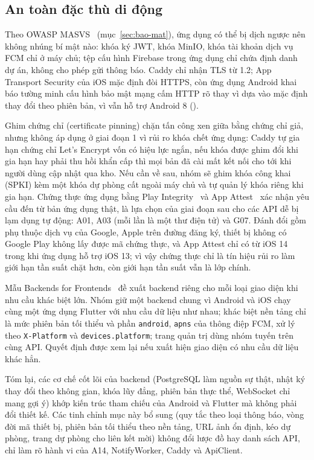 \subsection{An toàn đặc thù di động}\label{ssec:an-toan-di-dong}

Theo OWASP MASVS~\cite{masvs} (mục~\ref{sec:bao-mat}), ứng dụng có thể bị dịch ngược nên không nhúng bí mật nào: khóa ký JWT, khóa MinIO, khóa tài khoản dịch vụ FCM chỉ ở máy chủ; tệp cấu hình Firebase trong ứng dụng chỉ chứa định danh dự án, không cho phép gửi thông báo. Caddy chỉ nhận TLS từ 1.2; App Transport Security của iOS mặc định đòi HTTPS, còn ứng dụng Android khai báo tường minh cấu hình bảo mật mạng cấm HTTP rõ thay vì dựa vào mặc định thay đổi theo phiên bản, vì vẫn hỗ trợ Android 8 ().

Ghim chứng chỉ (certificate pinning) chặn tấn công xen giữa bằng chứng chỉ giả, nhưng không áp dụng ở giai đoạn 1 vì rủi ro khóa chết ứng dụng: Caddy tự gia hạn chứng chỉ Let's Encrypt vốn có hiệu lực ngắn, nếu khóa được ghim đổi khi gia hạn hay phải thu hồi khẩn cấp thì mọi bản đã cài mất kết nối cho tới khi người dùng cập nhật qua kho. Nếu cần về sau, nhóm sẽ ghim khóa công khai (SPKI) kèm một khóa dự phòng cất ngoài máy chủ và tự quản lý khóa riêng khi gia hạn. Chứng thực ứng dụng bằng Play Integrity~\cite{playintegrity} và App Attest~\cite{appattest} xác nhận yêu cầu đến từ bản ứng dụng thật, là lựa chọn của giai đoạn sau cho các API dễ bị lạm dụng tự động: A01, A03 (mỗi lần là một thư điện tử) và G07. Đánh đổi gồm phụ thuộc dịch vụ của Google, Apple trên đường đăng ký, thiết bị không có Google Play không lấy được mã chứng thực, và App Attest chỉ có từ iOS 14 trong khi ứng dụng hỗ trợ iOS 13; vì vậy chứng thực chỉ là tín hiệu rủi ro làm giới hạn tần suất chặt hơn, còn giới hạn tần suất vẫn là lớp chính.

Mẫu Backends for Frontends~\cite{bff} đề xuất backend riêng cho mỗi loại giao diện khi nhu cầu khác biệt lớn. Nhóm giữ một backend chung vì Android và iOS chạy cùng một ứng dụng Flutter với nhu cầu dữ liệu như nhau; khác biệt nền tảng chỉ là mức phiên bản tối thiểu và phần \texttt{android}, \texttt{apns} của thông điệp FCM, xử lý theo \texttt{X-Platform} và \texttt{devices.platform}; trang quản trị dùng nhóm tuyến  trên cùng API. Quyết định được xem lại nếu xuất hiện giao diện có nhu cầu dữ liệu khác hẳn.

Tóm lại, các cơ chế cốt lõi của backend (PostgreSQL làm nguồn sự thật, nhật ký thay đổi theo không gian, khóa lũy đẳng, phiên bản thực thể, WebSocket chỉ mang gợi ý) khớp kiến trúc tham chiếu của Android và Flutter mà không phải đổi thiết kế. Các tinh chỉnh mục này bổ sung (quy tắc theo loại thông báo, vòng đời mã thiết bị, phiên bản tối thiểu theo nền tảng, URL ảnh ổn định, kéo dự phòng, trang dự phòng cho liên kết mời) không đổi lược đồ hay danh sách API, chỉ làm rõ hành vi của A14, NotifyWorker, Caddy và ApiClient.
